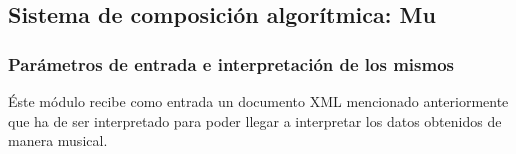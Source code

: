\subsection{Sistema de composición algorítmica: Mu}


\subsubsection{Parámetros de entrada e interpretación de los mismos}

Éste módulo recibe como entrada un documento XML mencionado anteriormente  que ha de ser interpretado para poder llegar a interpretar los datos obtenidos de manera musical.